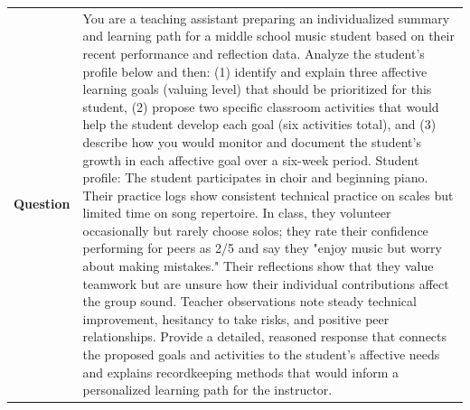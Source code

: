 \begin{longtable}{@{}l p{12.5cm}@{}}
  \textbf{Question} & You are a teaching assistant preparing an individualized summary and learning path for a middle school music student based on their recent performance and reflection data. Analyze the student's profile below and then: (1) identify and explain three affective learning goals (valuing level) that should be prioritized for this student, (2) propose two specific classroom activities that would help the student develop each goal (six activities total), and (3) describe how you would monitor and document the student's growth in each affective goal over a six-week period. \newline Student profile: The student participates in choir and beginning piano. Their practice logs show consistent technical practice on scales but limited time on song repertoire. In class, they volunteer occasionally but rarely choose solos; they rate their confidence performing for peers as 2/5 and say they "enjoy music but worry about making mistakes." Their reflections show that they value teamwork but are unsure how their individual contributions affect the group sound. Teacher observations note steady technical improvement, hesitancy to take risks, and positive peer relationships. \newline Provide a detailed, reasoned response that connects the proposed goals and activities to the student's affective needs and explains recordkeeping methods that would inform a personalized learning path for the instructor. \\

\end{longtable}
